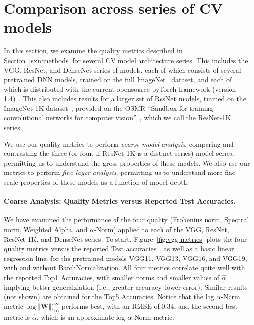 \section{Comparison across series of CV models}
\label{sxn:cv}





In this section, we examine the quality metrics described in Section~\ref{sxn:methods} for several CV model architecture series.
This includes the VGG, ResNet, and DenseNet series of models, each of which consists of several pretrained DNN models, trained on the full ImageNet~\cite{imagenet} dataset, and each of which is distributed with the current opensource pyTorch framework (version 1.4)~\cite{pyTorch}.
This also includes results for a larger set of ResNet models, trained on the ImageNet-1K dataset~\cite{imagenet1k}, provided on the OSMR ``Sandbox for training convolutional networks for computer vision''~\cite{osmr}, which we call the ResNet-1K series.

We use our quality metrics to perform \emph{coarse model analysis}, comparing and contrasting the three (or four, if ResNet-1K is a distinct series) model series, permitting us to understand the gross properties of these models. 
We also use our metrics to perform \emph{fine layer analysis}, permitting us to understand more fine-scale properties of these models as a function of model depth.


\paragraph{Coarse Analysis: Quality Metrics versus Reported Test Accuracies.}

We have examined the performance of the four quality (Frobenius norm, Spectral norm, Weighted Alpha, and $\alpha$-Norm) applied to each of the VGG, ResNet, ResNet-1K, and DenseNet series.
To start, Figure~\ref{fig:vgg-metrics} plots the four quality metrics versus the reported Test accuracies~\cite{pyTorchVgg}, as well as a basic linear regression line, 
for the pretrained models VGG11, VGG13, VGG16, and VGG19, with and without BatchNormalization.
All four metrics correlate quite well with the reported Top1 Accuracies, with smaller norms and smaller values of $\hat{\alpha}$ implying better generalziation (i.e., greater accuracy, lower error). 
Similar results (not shown) are obtained for the Top5 Accuracies.  
Notice that the log $\alpha$-Norm metric $\log\Vert\mathbf{W}\Vert)_{\infty}^{\infty}$ 
performs best, with an RMSE of $0.34$; and the second best metric is $\hat\alpha$, which is an approximate log $\alpha$-Norm metric.


